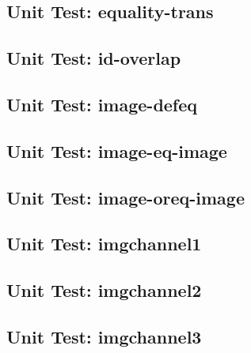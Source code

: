 \subsection*{Unit Test: equality-trans}

 \clearpage
\subsection*{Unit Test: id-overlap}

 \clearpage
\subsection*{Unit Test: image-defeq}

 \clearpage
\subsection*{Unit Test: image-eq-image}

 \clearpage
\subsection*{Unit Test: image-oreq-image}

 \clearpage
\subsection*{Unit Test: imgchannel1}

 \clearpage
\subsection*{Unit Test: imgchannel2}

 \clearpage
\subsection*{Unit Test: imgchannel3}

 \clearpage
